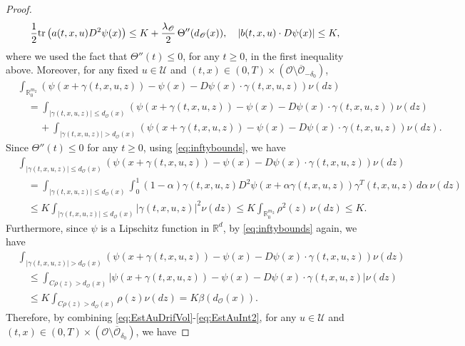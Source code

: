 \documentclass[amscd,amssymb,11pt]{article}
\numberwithin{theorem}{section}
\numberwithin{equation}{section}
\begin{document}
\begin{proof}
\begin{align}\label{eq:EstAuDrifVol}
\frac{1}{2}{\rm tr}\left(a(t,x,u)D^{2}\psi(x)\right)\leq K+\frac{\lambda_{\mathscr{O}}}{2}\,\Theta''(d_{\mathscr{O}}(x)),\quad |b(t,x,u)\cdot D\psi(x)|\leq K,
\end{align}
where we used the fact that $\Theta''(t)\leq 0$, for any $t\geq 0$, in the first inequality above. Moreover, for any fixed $u\in\mathcal{U}$ and $(t,x)\in(0,T)\times(\mathscr{O}\setminus\overline{\mathscr{O}}_{-\delta_{0}})$,
\begin{align}
&\int_{\mathbb{R}_{0}^{m_{2}}}\left(\psi(x+\gamma(t,x,u,z))-\psi(x)-D\psi(x)\cdot\gamma(t,x,u,z)\right)\nu(dz)\nonumber\\
&\quad =\int_{|\gamma(t,x,u,z)|\leq d_{\mathscr{O}}(x)}\left(\psi(x+\gamma(t,x,u,z))-\psi(x)-D\psi(x)\cdot\gamma(t,x,u,z)\right)\nu(dz)\nonumber\\
\label{eq:DecomAuInt} &\qquad\,+\int_{|\gamma(t,x,u,z)|>d_{\mathscr{O}}(x)}\left(\psi(x+\gamma(t,x,u,z))-\psi(x)-D\psi(x)\cdot\gamma(t,x,u,z)\right)\nu(dz).
\end{align}
Since $\Theta''(t)\leq 0$ for any $t\geq 0$, using \eqref{eq:inftybounds}, we have
\begin{align}
&\int_{|\gamma(t,x,u,z)|\leq d_{\mathscr{O}}(x)}\left(\psi(x+\gamma(t,x,u,z))-\psi(x)-D\psi(x)\cdot \gamma(t,x,u,z)\right)\nu(dz)\nonumber\\
&\quad =\int_{|\gamma(t,x,u,z)|\leq d_{\mathscr{O}}(x)}\int_{0}^{1}(1-\alpha)\gamma(t,x,u,z)D^{2}\psi(x+\alpha\gamma(t,x,u,z))\gamma^{T}(t,x,u,z)\,d\alpha\,\nu(dz)\nonumber\\
\label{eq:EstAuInt1} &\quad\leq K\int_{|\gamma(t,x,u,z)|\leq d_{\mathscr{O}}(x)}|\gamma(t,x,u,z)|^{2}\nu(dz)\leq K\int_{\mathbb{R}_{0}^{m_{2}}}\rho^{2}(z)\,\nu(dz)\leq K.
\end{align}
Furthermore, since $\psi$ is a Lipschitz function in $\mathbb{R}^{d}$, by \eqref{eq:inftybounds} again, we have
\begin{align}
&\int_{|\gamma(t,x,u,z)|>d_{\mathscr{O}}(x)}\left(\psi(x+\gamma(t,x,u,z))-\psi(x)-D\psi(x)\cdot\gamma(t,x,u,z)\right)\nu(dz)\nonumber\\
&\quad\leq\int_{C\rho(z)>d_{\mathscr{O}}(x)}\left|\psi(x+\gamma(t,x,u,z))-\psi(x)-D\psi(x)\cdot\gamma(t,x,u,z)\right|\nu(dz)\nonumber\\
\label{eq:EstAuInt2} &\quad\leq K\int_{C\rho(z)>d_{\mathscr{O}}(x)}\rho(z)\nu(dz)=K\beta(d_{\mathscr{O}}(x)).
\end{align}
Therefore, by combining \eqref{eq:EstAuDrifVol}-\eqref{eq:EstAuInt2}, for any $u\in\mathcal{U}$ and $(t,x)\in(0,T)\times(\mathscr{O}\setminus\overline{\mathscr{O}}_{\delta_{0}})$, we have

\end{proof}
\end{document}

